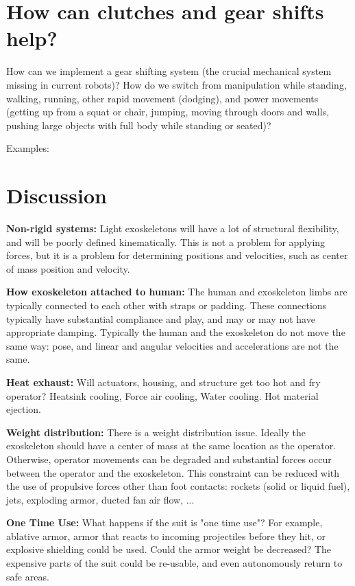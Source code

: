 \documentclass[letterpaper,12pt,fullpage]{article}
\begin{document}
\section{How can clutches and gear shifts help?}

How can we implement a gear shifting system (the crucial mechanical
system missing in current robots)? How do we switch from manipulation
while standing, walking, running, other rapid movement (dodging), and
power movements (getting up from a squat or chair,
jumping, moving through doors and walls, pushing large objects
with full body while standing or seated)?

Examples:~\cite{IEEE07222598}

\section{Discussion}

{\bf Non-rigid systems:}
Light exoskeletons will have a lot of structural flexibility,
and will be poorly defined kinematically. This is not a
problem for applying forces, but it is a problem for determining
positions and velocities, such as center of mass position and velocity.

{\bf How exoskeleton attached to human:}
The human and exoskeleton limbs are typically connected to each
other with straps or padding. These connections typically have substantial
compliance and play, and may or may not have appropriate damping.
Typically the human and the exoskeleton do not move the same way:
pose, and linear and angular velocities and accelerations are not the same.

{\bf Heat exhaust:}
Will actuators, housing, and structure get too hot and fry operator?
Heatsink cooling, Force air cooling, Water cooling.
Hot material ejection.

{\bf Weight distribution:}
There is a weight distribution issue. Ideally the exoskeleton should
have a center of mass at the same location as the operator. Otherwise,
operator movements can be degraded and substantial forces occur between
the operator and the exoskeleton.
This constraint can be reduced with the use of propulsive forces other
than foot contacts: rockets (solid or liquid fuel), jets, exploding armor,
ducted fan air flow, ...

{\bf One Time Use:}
What happens if the suit is "one time use"? For example, ablative armor,
armor that reacts to incoming projectiles before they hit,
or explosive shielding could be used. Could the armor weight be decreased?
The expensive parts of the suit could be re-usable, and even autonomously
return to safe areas.
\end{document}
